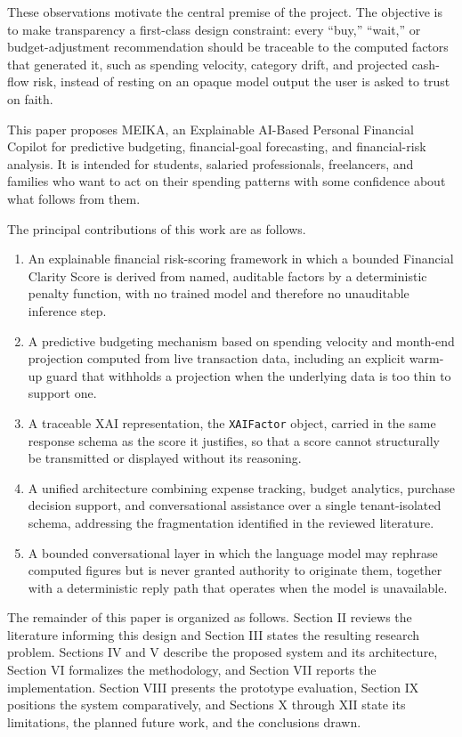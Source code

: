 \documentclass[conference]{IEEEtran}
\begin{document}
These observations motivate the central premise of the project. The objective is to make transparency a first-class design constraint: every ``buy,'' ``wait,'' or budget-adjustment recommendation should be traceable to the computed factors that generated it, such as spending velocity, category drift, and projected cash-flow risk, instead of resting on an opaque model output the user is asked to trust on faith.

This paper proposes MEIKA, an Explainable AI-Based Personal Financial Copilot for predictive budgeting, financial-goal forecasting, and financial-risk analysis. It is intended for students, salaried professionals, freelancers, and families who want to act on their spending patterns with some confidence about what follows from them.

The principal contributions of this work are as follows.

\begin{enumerate}
\item An explainable financial risk-scoring framework in which a bounded Financial Clarity Score is derived from named, auditable factors by a deterministic penalty function, with no trained model and therefore no unauditable inference step.
\item A predictive budgeting mechanism based on spending velocity and month-end projection computed from live transaction data, including an explicit warm-up guard that withholds a projection when the underlying data is too thin to support one.
\item A traceable XAI representation, the \texttt{XAIFactor} object, carried in the same response schema as the score it justifies, so that a score cannot structurally be transmitted or displayed without its reasoning.
\item A unified architecture combining expense tracking, budget analytics, purchase decision support, and conversational assistance over a single tenant-isolated schema, addressing the fragmentation identified in the reviewed literature.
\item A bounded conversational layer in which the language model may rephrase computed figures but is never granted authority to originate them, together with a deterministic reply path that operates when the model is unavailable.
\end{enumerate}

The remainder of this paper is organized as follows. Section II reviews the literature informing this design and Section III states the resulting research problem. Sections IV and V describe the proposed system and its architecture, Section VI formalizes the methodology, and Section VII reports the implementation. Section VIII presents the prototype evaluation, Section IX positions the system comparatively, and Sections X through XII state its limitations, the planned future work, and the conclusions drawn.
\end{document}
